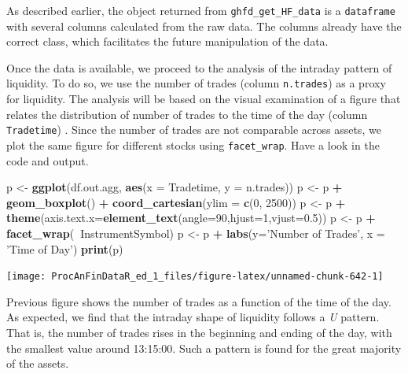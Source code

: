 \documentclass[11pt,]{book}
\newenvironment{Shaded}{\begin{snugshade}}{\end{snugshade}}
\newcommand{\KeywordTok}[1]{\textcolor[rgb]{0.27,0.27,0.27}{\textbf{#1}}}
\newcommand{\DataTypeTok}[1]{\textcolor[rgb]{0.27,0.27,0.27}{#1}}
\newcommand{\DecValTok}[1]{\textcolor[rgb]{0.06,0.06,0.06}{#1}}
\newcommand{\FloatTok}[1]{\textcolor[rgb]{0.06,0.06,0.06}{#1}}
\newcommand{\StringTok}[1]{\textcolor[rgb]{0.5,0.5,0.5}{#1}}
\newcommand{\OperatorTok}[1]{\textcolor[rgb]{0.81,0.36,0.00}{\textbf{#1}}}
\newcommand{\NormalTok}[1]{#1}
\begin{document}
As described earlier, the object returned from
\texttt{ghfd\_get\_HF\_data} is a \texttt{dataframe} with several
columns calculated from the raw data. The columns already have the
correct class, which facilitates the future manipulation of the data.

Once the data is available, we proceed to the analysis of the intraday
pattern of liquidity. To do so, we use the number of trades (column
\texttt{n.trades}) as a proxy for liquidity. The analysis will be based
on the visual examination of a figure that relates the distribution of
number of trades to the time of the day (column \texttt{Tradetime}) .
Since the number of trades are not comparable across assets, we plot the
same figure for different stocks using \texttt{facet\_wrap}. Have a look
in the code and output.

\begin{Shaded}
\begin{Highlighting}[]
\NormalTok{p <-}\StringTok{ }\KeywordTok{ggplot}\NormalTok{(df.out.agg, }\KeywordTok{aes}\NormalTok{(}\DataTypeTok{x =}\NormalTok{  Tradetime, }\DataTypeTok{y =}\NormalTok{ n.trades))}
\NormalTok{p <-}\StringTok{ }\NormalTok{p }\OperatorTok{+}\StringTok{ }\KeywordTok{geom_boxplot}\NormalTok{() }\OperatorTok{+}\StringTok{ }\KeywordTok{coord_cartesian}\NormalTok{(}\DataTypeTok{ylim =} \KeywordTok{c}\NormalTok{(}\DecValTok{0}\NormalTok{, }\DecValTok{2500}\NormalTok{))}
\NormalTok{p <-}\StringTok{ }\NormalTok{p  }\OperatorTok{+}\StringTok{ }\KeywordTok{theme}\NormalTok{(}\DataTypeTok{axis.text.x=}\KeywordTok{element_text}\NormalTok{(}\DataTypeTok{angle=}\DecValTok{90}\NormalTok{,}\DataTypeTok{hjust=}\DecValTok{1}\NormalTok{,}\DataTypeTok{vjust=}\FloatTok{0.5}\NormalTok{))}
\NormalTok{p <-}\StringTok{ }\NormalTok{p }\OperatorTok{+}\StringTok{ }\KeywordTok{facet_wrap}\NormalTok{(}\OperatorTok{~}\NormalTok{InstrumentSymbol)}
\NormalTok{p <-}\StringTok{ }\NormalTok{p }\OperatorTok{+}\StringTok{ }\KeywordTok{labs}\NormalTok{(}\DataTypeTok{y=}\StringTok{'Number of Trades'}\NormalTok{, }\DataTypeTok{x =} \StringTok{'Time of Day'}\NormalTok{)}
\KeywordTok{print}\NormalTok{(p)}
\end{Highlighting}
\end{Shaded}

\begin{center}\texttt{[image: ProcAnFinDataR\_ed\_1\_files/figure-latex/unnamed-chunk-642-1]} \end{center}

Previous figure shows the number of trades as a function of the time of
the day. As expected, we find that the intraday shape of liquidity
follows a \emph{U} pattern. That is, the number of trades rises in the
beginning and ending of the day, with the smallest value around
13:15:00. Such a pattern is found for the great majority of the assets.
\end{document}

